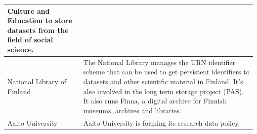 \begin{tabularx}{\textwidth}{| >{\raggedright}p{3cm} | X |}
                                              Culture and Education to store datasets from the field of social
                                              science.\\
  \hline
  National Library of Finland               & The National Library manages the URN identifier scheme that can be
                                              used to get persistent identifiers to datasets and other scientific
                                              material in Finland. It's also involved in the long term storage
                                              project (PAS). It also runs Finna\footnotemark, a digital archive for
                                              Finnish museums, archives and libraries.\\
  \hline
  \rowcolor{Gray}
  Aalto University                          & Aalto University is forming its research data policy. \\
  \hline
\end{tabularx}

\addtocounter{footnote}{-4}
\addtocounter{footnote}{1}
\addtocounter{footnote}{1}
\addtocounter{footnote}{1}
\addtocounter{footnote}{1}

